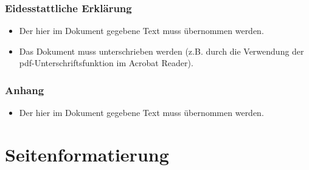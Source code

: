 \subsection*{Eidesstattliche Erklärung}

\begin{itemize}
	\item Der hier im Dokument gegebene Text muss übernommen werden.
	\item Das Dokument muss unterschrieben werden (z.B. durch die Verwendung der pdf-Unterschriftsfunktion im Acrobat Reader).
\end{itemize}

\subsection*{Anhang}

\begin{itemize}
	\item Der hier im Dokument gegebene Text muss übernommen werden.
\end{itemize}

\newpage
\chapter{Seitenformatierung}

